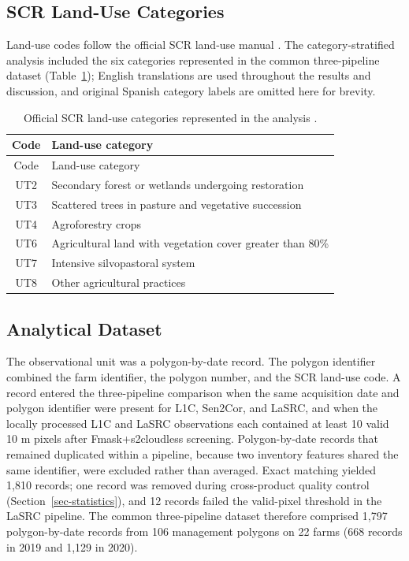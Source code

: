 \documentclass[remotesensing,article,submit,pdftex,oneauthor]{Definitions/mdpi}
\begin{document}
\subsection{SCR Land-Use Categories}\label{sec-ut}

Land-use codes follow the official SCR land-use manual
\citep{SCRLandUseManual2017}. The category-stratified analysis included
the six categories represented in the common three-pipeline dataset
(Table~\ref{tbl-ut}); English translations are used throughout the
results and discussion, and original Spanish category labels are omitted
here for brevity.

\begin{longtable}[]{@{}cl@{}}
\caption{Official SCR land-use categories represented in the analysis
\citep{SCRLandUseManual2017}.}\label{tbl-ut}\tabularnewline
\toprule\noalign{}
Code & Land-use category \\
\midrule\noalign{}
\endfirsthead
\toprule\noalign{}
Code & Land-use category \\
\midrule\noalign{}
\endhead
\bottomrule\noalign{}
\endlastfoot
UT2 & Secondary forest or wetlands undergoing restoration \\
UT3 & Scattered trees in pasture and vegetative succession \\
UT4 & Agroforestry crops \\
UT6 & Agricultural land with vegetation cover greater than 80\% \\
UT7 & Intensive silvopastoral system \\
UT8 & Other agricultural practices \\
\end{longtable}

\subsection{Analytical Dataset}\label{sec-inclusion}

The observational unit was a polygon-by-date record. The polygon
identifier combined the farm identifier, the polygon number, and the SCR
land-use code. A record entered the three-pipeline comparison when the
same acquisition date and polygon identifier were present for L1C,
Sen2Cor, and LaSRC, and when the locally processed L1C and LaSRC
observations each contained at least 10 valid 10 m pixels after
Fmask+s2cloudless screening. Polygon-by-date records that remained
duplicated within a pipeline, because two inventory features shared the
same identifier, were excluded rather than averaged. Exact matching
yielded 1,810 records; one record was removed during cross-product
quality control (Section~\ref{sec-statistics}), and 12 records failed
the valid-pixel threshold in the LaSRC pipeline. The common
three-pipeline dataset therefore comprised 1,797 polygon-by-date records
from 106 management polygons on 22 farms (668 records in 2019 and 1,129
in 2020).
\end{document}
